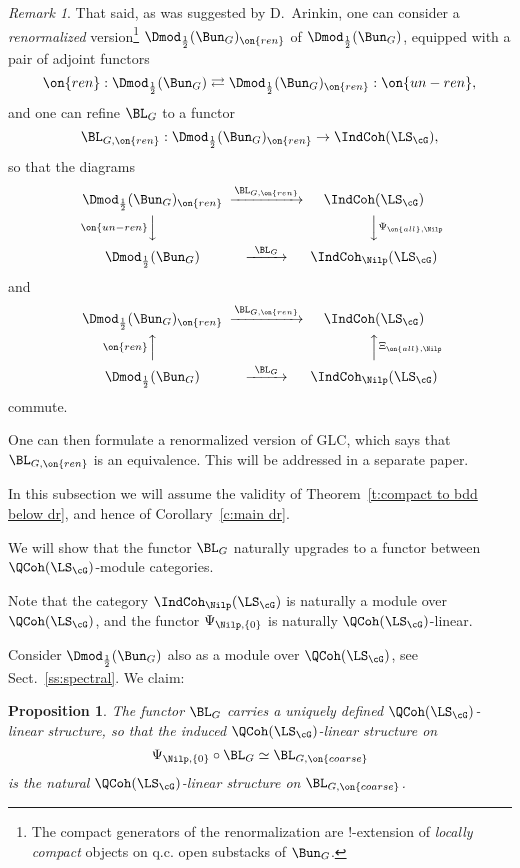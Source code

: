 \documentclass[9pt]{amsart}
\newtheorem{prop}[subsubsection]{Proposition}
\theoremstyle{remark}
\newtheorem{rem}[subsubsection]{Remark}
\theoremstyle{definition}
\theoremstyle{remark}
\newcommand{\thmref}[1]{Theorem~\ref{#1}}
\newcommand{\secref}[1]{Sect.~\ref{#1}}
\newcommand{\corref}[1]{Corollary~\ref{#1}}
\numberwithin{equation}{section}
\begin{document}
\begin{rem}

That said, as was suggested by D.~Arinkin, 
one can consider a \emph{renormalized} version\footnote{The compact generators of the renormalization are !-extension of \emph{locally compact}
objects on q.c. open substacks of $\Bun_G$.} $\Dmod_{\frac{1}{2}}(\Bun_G)_{\on{ren}}$
of $\Dmod_{\frac{1}{2}}(\Bun_G)$,
equipped with a pair of adjoint functors
$$\on{ren}:\Dmod_{\frac{1}{2}}(\Bun_G)\rightleftarrows \Dmod_{\frac{1}{2}}(\Bun_G)_{\on{ren}}:\on{un-ren},$$
and one can refine $\BL_G$ to a functor
$$\BL_{G,\on{ren}}:\Dmod_{\frac{1}{2}}(\Bun_G)_{\on{ren}}\to \IndCoh(\LS_\cG),$$
so that the diagrams
$$
\CD
\Dmod_{\frac{1}{2}}(\Bun_G)_{\on{ren}} @>{\BL_{G,\on{ren}}}>> \IndCoh(\LS_\cG) \\
@V{\on{un-ren}}VV @VV{\Psi_{\on{all},\Nilp}}V \\
\Dmod_{\frac{1}{2}}(\Bun_G)@>{\BL_G}>> \IndCoh_\Nilp(\LS_\cG) 
\endCD
$$
and
$$
\CD
\Dmod_{\frac{1}{2}}(\Bun_G)_{\on{ren}} @>{\BL_{G,\on{ren}}}>> \IndCoh(\LS_\cG) \\
@A{\on{ren}}AA @AA{\Xi_{\on{all},\Nilp}}A \\
\Dmod_{\frac{1}{2}}(\Bun_G)@>{\BL_G}>> \IndCoh_\Nilp(\LS_\cG) 
\endCD
$$
commute. 

\medskip

One can then formulate a renormalized version of GLC, which says that $\BL_{G,\on{ren}}$ is an equivalence. 
This will be addressed in a separate paper.

\end{rem}



In this subsection we will assume the validity of \thmref{t:compact to bdd below dr}, and hence of
\corref{c:main dr}. 

\medskip

We will show that the functor $\BL_G$ naturally upgrades to a functor between
$\QCoh(\LS_\cG)$-module categories. 

\sssec{}

Note that the category $\IndCoh_\Nilp(\LS_\cG)$ is naturally a module over $\QCoh(\LS_\cG)$,
and the functor $\Psi_{\Nilp,\{0\}}$ is naturally $\QCoh(\LS_\cG)$-linear.

\medskip

Consider $\Dmod_{\frac{1}{2}}(\Bun_G)$ also as a module over $\QCoh(\LS_\cG)$, see \secref{ss:spectral}.
We claim:

\begin{prop} \label{p:L and Hecke}
The functor $\BL_G$ carries a uniquely defined $\QCoh(\LS_\cG)$-linear structure, 
so that the induced $\QCoh(\LS_\cG)$-linear structure on
$$\Psi_{\Nilp,\{0\}}\circ \BL_G\simeq \BL_{G,\on{coarse}}$$
is the natural $\QCoh(\LS_\cG)$-linear structure on $\BL_{G,\on{coarse}}$.
\end{prop} 
\end{document}
